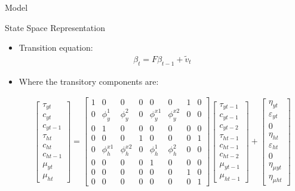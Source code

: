 \documentclass[
  ignorenonframetext,
]{beamer}
\begin{document}
\begin{frame}{Model}
\protect\hypertarget{model}{}
\begin{block}{State Space Representation}
\protect\hypertarget{state-space-representation}{}
\begin{itemize}
\item
  Transition equation: \begin{align}
        \beta_t = F\beta_{t-1} + \tilde{v}_t
    \end{align}
\item
  Where the transitory components are:

  \begin{align*}
    \begin{bmatrix}
    \tau_{yt} \\
    c_{yt}    \\
    c_{yt-1}    \\
    \tau_{ht} \\
    c_{ht}    \\
    c_{ht-1}  \\
    \mu_{yt} \\
    \mu_{ht}  
    \end{bmatrix}
    =
    \begin{bmatrix}
    1 & 0 & 0 & 0 & 0 & 0 & 1 & 0 \\
    0 & \phi^1_y  & \phi^2_y  & 0 & \phi^{x1}_y & \phi^{x2}_y & 0 & 0\\
    0 & 1 & 0 & 0 & 0 & 0 & 0 & 0\\
    0 & 0 & 0 & 1 & 0 & 0 & 0 & 1\\
    0 & \phi^{x1}_h & \phi^{x2}_h & 0 &\phi^1_h & \phi^2_h  & 0 & 0\\
    0 & 0 & 0 & 0 & 1 & 0 & 0 & 0 \\
    0 & 0 & 0 & 0 & 0 & 0 & 1 & 0 \\
    0 & 0 & 0 & 0 & 0 & 0 & 0 & 1 
    \end{bmatrix}
    \begin{bmatrix}
    \tau_{yt-1} \\
    c_{yt-1}    \\
    c_{yt-2}    \\
    \tau_{ht-1} \\
    c_{ht-1}    \\
    c_{ht-2}    \\
    \mu_{yt-1} \\
    \mu_{ht-1} 
    \end{bmatrix}
    +
    \begin{bmatrix}
    \eta_{yt} \\
    \varepsilon_{yt}    \\
    0 \\
    \eta_{ht} \\
    \varepsilon_{ht}    \\
    0 \\
    \eta_{\mu yt} \\
    \eta_{\mu ht}
    \end{bmatrix}
    \end{align*}
\end{itemize}
\end{block}
\end{frame}
\end{document}
